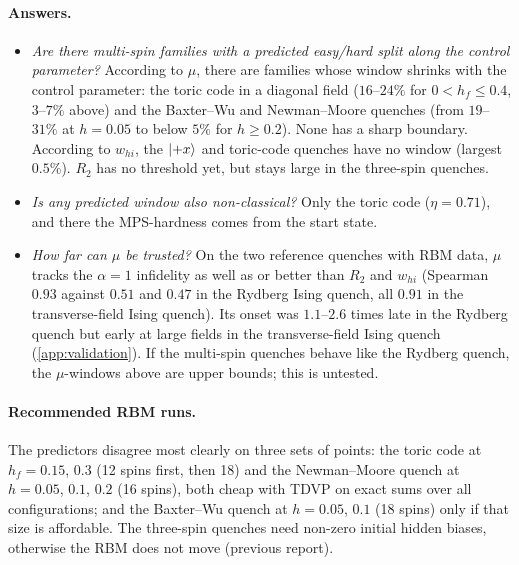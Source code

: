 \documentclass[11pt,a4paper]{article}
\newcommand{\whi}{w_{hi}}
\begin{document}
\paragraph{Answers.}
\begin{itemize}
  \item \emph{Are there multi-spin families with a predicted easy/hard split along the control parameter?}
    According to $\mu$, there are families whose window shrinks with the control parameter: the toric code in a
    diagonal field ($16$--$24\%$ for $0<h_f\le0.4$, $3$--$7\%$ above) and the Baxter--Wu and Newman--Moore quenches (from
    $19$--$31\%$ at $h=0.05$ to below $5\%$ for $h\ge0.2$). None has a sharp boundary. According to $\whi$, the
    $\ket{+x}$ and toric-code quenches have no window (largest $0.5\%$). $R_2$ has no threshold yet, but stays large
    in the three-spin quenches.
  \item \emph{Is any predicted window also non-classical?} Only the toric code ($\eta=0.71$), and there the MPS-hardness
    comes from the start state.
  \item \emph{How far can $\mu$ be trusted?} On the two reference quenches with RBM data, $\mu$ tracks the $\alpha=1$
    infidelity as well as or better than $R_2$ and $\whi$ (Spearman $0.93$ against $0.51$ and $0.47$ in the Rydberg Ising
    quench, all $0.91$ in the transverse-field Ising quench). Its onset was $1.1$--$2.6$ times late in the Rydberg
    quench but early at large fields in the transverse-field Ising quench (\cref{app:validation}). If the multi-spin
    quenches behave like the Rydberg quench, the $\mu$-windows above are upper bounds; this is untested.
\end{itemize}

\paragraph{Recommended RBM runs.}
The predictors disagree most clearly on three sets of points: the toric code at $h_f=0.15$, $0.3$ (12 spins first,
then 18) and the Newman--Moore quench at $h=0.05$, $0.1$, $0.2$ (16 spins), both cheap with TDVP on exact sums over all
configurations; and the Baxter--Wu quench at $h=0.05$, $0.1$ (18 spins) only if that size is affordable. The three-spin
quenches need non-zero initial hidden biases, otherwise the RBM does not move (previous report).
\end{document}
